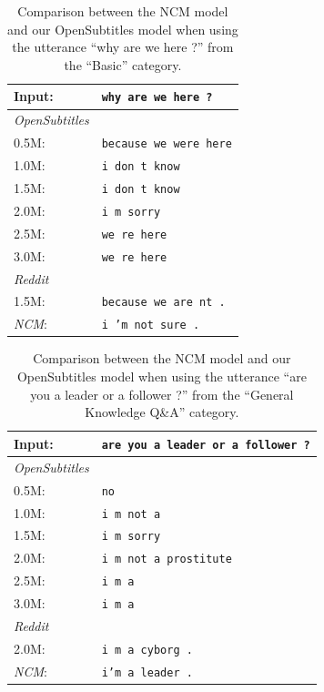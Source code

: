 \begin{table}[H]
	\centering
	\begin{adjustbox}{max width=\textwidth}
		\begin{tabularx}{\textwidth}{lX}
			\toprule
			Input: 	& \texttt{why are we here ?}\\
			\midrule
			\emph{OpenSubtitles}\\
			0.5M: 	& \texttt{because we were here}\\
			1.0M: 	& \texttt{i don t know}\\
			1.5M:	& \texttt{i don t know}\\
			2.0M:	& \texttt{i m sorry}\\
			2.5M:	& \texttt{we re here}\\
			3.0M:	& \texttt{we re here}\\
			\midrule
			\emph{Reddit}\\
			1.5M:	& \texttt{because we are nt .}\\
			\midrule
			\emph{NCM}:	& \texttt{i ’m not sure .}\\
			\bottomrule
		\end{tabularx}
	\end{adjustbox}
	\caption{Comparison between the NCM model and our OpenSubtitles model when using the utterance ``why are we here ?'' from the ``Basic'' category.}
	\label{results:example9_output:Neural_Conversational_Model_compared}
\end{table}
\begin{table}[H]
	\centering
	\begin{adjustbox}{max width=\textwidth}
		\begin{tabularx}{\textwidth}{lX}
			\toprule
			Input: 	& \texttt{are you a leader or a follower ?}\\
			\midrule
			\emph{OpenSubtitles}\\
			0.5M: 	& \texttt{no}\\
			1.0M: 	& \texttt{i m not a}\\
			1.5M:	& \texttt{i m sorry}\\
			2.0M:	& \texttt{i m not a prostitute}\\
			2.5M:	& \texttt{i m a}\\
			3.0M:	& \texttt{i m a}\\
			\midrule
			\emph{Reddit}\\
			2.0M:	& \texttt{i m a cyborg .}\\
			\midrule
			\emph{NCM}:	& \texttt{i'm a leader .}\\
			\bottomrule
		\end{tabularx}
	\end{adjustbox}
	\caption{Comparison between the NCM model and our OpenSubtitles model when using the utterance ``are you a leader or a follower ?'' from the ``General Knowledge Q\&A'' category.}
	\label{results:example10_output:Neural_Conversational_Model_compared}
\end{table}
